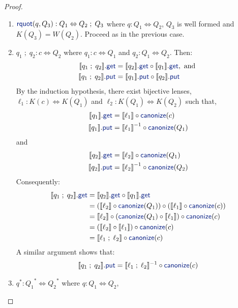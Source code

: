 \documentclass[acmsmall,review,anonymous]{acmart}
\newcommand{\kw}[1]{\textcolor{dkblue}{\ensuremath{\mathsf{#1}}}}
\newcommand{\canonize}{\ensuremath{\kw{canonize}}}
\newcommand{\get}{\ensuremath{\kw{get}}}
\newcommand{\lput}{\ensuremath{\kw{put}}}
\newcommand{\rquot}{\ensuremath{\kw{rquot}}}
\begin{document}
\begin{proof}
\begin{enumerate}
\item
$\rquot(q, Q_3):Q_1 \Leftrightarrow Q_2 \; ; \; Q_3$ where $q : Q_1
\Leftrightarrow Q_2$, $Q_3$ is well formed and $K(Q_3) = W(Q_2)$. Proceed as in
the previous case.
\item
$q_1 \; ; \; q_2: c \Leftrightarrow Q_2$ where $q_1 : c \Leftrightarrow Q_1$ and
$q_2 : Q_1 \Leftrightarrow Q_2$. Then:
\begin{align*}
\llbracket q_1 \; ; \; q_2 \rrbracket.\get &= \llbracket q_2
\rrbracket.\get\circ \llbracket q_1 \rrbracket.\get, \text{ and }\\
\llbracket q_1 \; ; \; q_2 \rrbracket.\lput &= \llbracket q_1 \rrbracket.\lput
\circ \llbracket q_2 \rrbracket.\lput
\end{align*}
By the induction hypothesis, there exist bijective lenses,
$\ell_1 :
K(c) \Leftrightarrow K(Q_1)$ and $\ell_2 : K(Q_1) \Leftrightarrow K(Q_2)$ such
that,
\begin{align*}
\llbracket q_1 \rrbracket.\get &= \llbracket \ell_1 \rrbracket \circ
\canonize(c)\\
\llbracket q_1 \rrbracket.\lput &= {\llbracket \ell_1 \rrbracket}^{-1} \circ
\canonize(Q_1)
\end{align*}
and
\begin{align*}
\llbracket q_2 \rrbracket.\get &= \llbracket \ell_2 \rrbracket \circ
\canonize(Q_1)\\
\llbracket q_2 \rrbracket.\lput &= {\llbracket \ell_2 \rrbracket}^{-1} \circ
\canonize(Q_2)
\end{align*}
Consequently:
\begin{align*}
\llbracket q_1 \; ; \; q_2 \rrbracket.\get &=
\llbracket q_2 \rrbracket.\get \circ \llbracket q_1 \rrbracket.\get \\
&=(\llbracket \ell_2 \rrbracket \circ \canonize(Q_1)) \circ (\llbracket \ell_1
\rrbracket \circ \canonize(c))\\
&= \llbracket \ell_2 \rrbracket \circ (\canonize(Q_1) \circ \llbracket \ell_1
\rrbracket) \circ \canonize(c)\\
&= (\llbracket \ell_2 \rrbracket \circ \llbracket \ell_1 \rrbracket) \circ
\canonize(c)\\
&= \llbracket \ell_1 \; ; \; \ell_2 \rrbracket \circ
\canonize(c)
\end{align*}
A similar argument shows that:
$$\llbracket q_1 \; ; \; q_2 \rrbracket.\lput =
\llbracket \ell_1 \; ; \; \ell_2 \rrbracket^{-1} \circ
\canonize(c)$$
\item
$q^* : {Q_1}^* \Leftrightarrow {Q_2}^*$ where $q : Q_1 \Leftrightarrow Q_2$,

\end{enumerate}
\end{proof}
\end{document}
